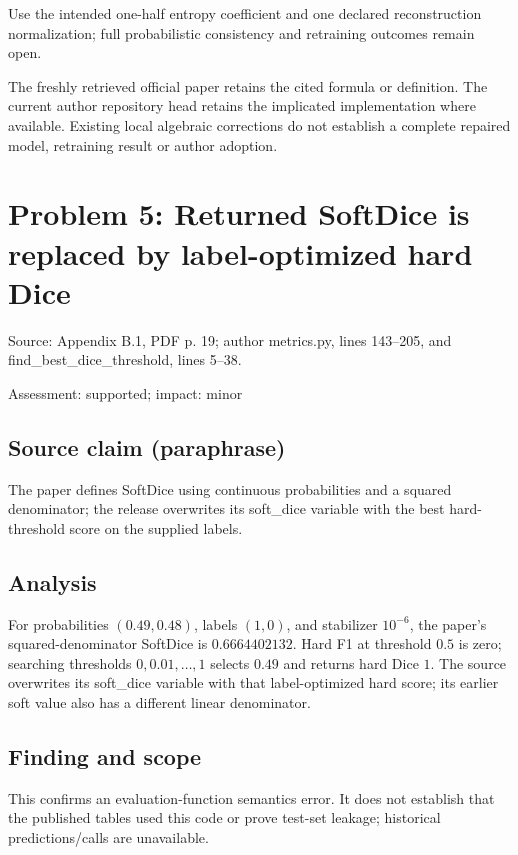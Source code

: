 \documentclass[11pt]{article}
\begin{document}
Use the intended one-half entropy coefficient and one declared reconstruction normalization; full probabilistic consistency and retraining outcomes remain open.

The freshly retrieved official paper retains the cited formula or definition. The current author repository head retains the implicated implementation where available. Existing local algebraic corrections do not establish a complete repaired model, retraining result or author adoption.

\section*{Problem 5: Returned SoftDice is replaced by label-optimized hard Dice}

Source: Appendix B.1, PDF p. 19; author metrics.py, lines 143–205, and find\_best\_dice\_threshold, lines 5–38.

Assessment: supported; impact: minor

\subsection*{Source claim (paraphrase)}

The paper defines SoftDice using continuous probabilities and a squared denominator; the release overwrites its soft\_dice variable with the best hard-threshold score on the supplied labels.

\subsection*{Analysis}

For probabilities \((0.49,0.48)\), labels \((1,0)\), and stabilizer \(10^{-6}\), the paper's squared-denominator SoftDice is \(0.6664402132\). Hard F1 at threshold \(0.5\) is zero; searching thresholds \(0,0.01,\ldots,1\) selects \(0.49\) and returns hard Dice \(1\). The source overwrites its soft\_dice variable with that label-optimized hard score; its earlier soft value also has a different linear denominator.

\subsection*{Finding and scope}

This confirms an evaluation-function semantics error. It does not establish that the published tables used this code or prove test-set leakage; historical predictions/calls are unavailable.
\end{document}
